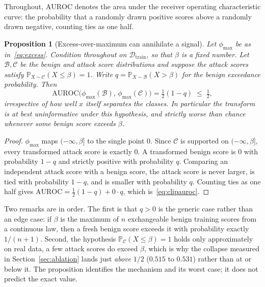 \documentclass[pdflatex,sn-basic]{sn-jnl}%
\theoremstyle{thmstyleone}
\newtheorem{proposition}[theorem]{Proposition}
\theoremstyle{thmstyletwo}
\theoremstyle{thmstylethree}
\newcommand{\Prob}{\mathbb{P}}
\newcommand{\Dcal}{\mathcal{D}}
\newcommand{\Ccal}{\mathcal{C}}
\newcommand{\Bcal}{\mathcal{B}}
\begin{document}
Throughout, $\mathrm{AUROC}$ denotes the area under the receiver operating
characteristic curve: the probability that a randomly drawn positive scores above
a randomly drawn negative, counting ties as one half.

\begin{proposition}[Excess-over-maximum can annihilate a signal]\label{prop:clip}
Let $\phi_{\max}$ be as in~\eqref{eq:excess}. Condition throughout on
$\Dcal_{\mathrm{train}}$, so that $\beta$ is a fixed number. Let $\Bcal, \Ccal$ be
the benign and attack score distributions and suppose the attack scores satisfy
$\Prob_{X \sim \Ccal}(X \le \beta) = 1$. Write
$q = \Prob_{X \sim \Bcal}(X > \beta)$ for the benign exceedance probability. Then
\begin{equation}\label{eq:clipauroc}
\mathrm{AUROC}\big(\phi_{\max}(\Bcal),\, \phi_{\max}(\Ccal)\big)
= \tfrac{1}{2}(1 - q) \;\le\; \tfrac{1}{2},
\end{equation}
irrespective of how well $x$ itself separates the classes. In particular the
transform is at best uninformative under this hypothesis, and strictly
worse than chance whenever some benign score exceeds $\beta$.
\end{proposition}

\begin{proof}
$\phi_{\max}$ maps $(-\infty, \beta]$ to the single point $0$. Since $\Ccal$ is
supported on $(-\infty,\beta]$, every transformed attack score is exactly $0$. A
transformed benign score is $0$ with probability $1-q$ and strictly positive with
probability $q$. Comparing an independent attack score with a benign score, the
attack score is never larger, is tied with probability $1-q$, and is smaller with
probability $q$. Counting ties as one half gives
$\mathrm{AUROC} = \tfrac{1}{2}(1-q) + 0 \cdot q$, which is~\eqref{eq:clipauroc}.
\end{proof}

Two remarks are in order. The first is that $q>0$ is the generic case rather than an edge case: if $\beta$
is the maximum of $n$ exchangeable benign training scores from a continuous law,
then a fresh benign score exceeds it with probability exactly $1/(n+1)$. Second,
the hypothesis $\Prob_{\Ccal}(X \le \beta) = 1$ holds only approximately on real
data, a few attack scores do exceed $\beta$, which is why the collapse measured
in Section~\ref{sec:ablation} lands just \emph{above} $1/2$ ($0.515$ to $0.531$)
rather than at or below it. The proposition identifies the mechanism and its worst
case; it does not predict the exact value.
\end{document}
